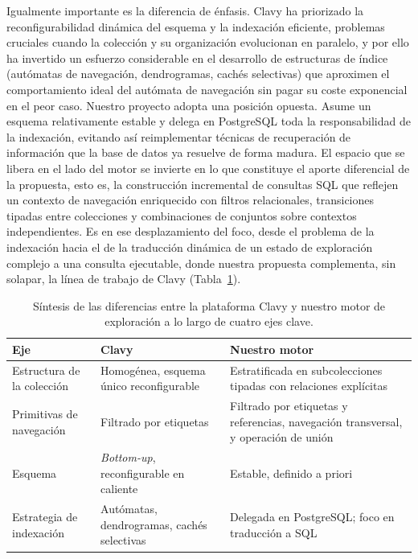 Igualmente importante es la diferencia de énfasis. Clavy ha priorizado la reconfigurabilidad dinámica
del esquema y la indexación eficiente, problemas cruciales cuando la colección y su organización
evolucionan en paralelo, y por ello ha invertido un esfuerzo considerable en el desarrollo de
estructuras de índice (autómatas de navegación, dendrogramas, cachés selectivas) que aproximen el
comportamiento ideal del autómata de navegación sin pagar su coste exponencial en el peor caso.
Nuestro proyecto adopta una posición opuesta. Asume un esquema relativamente estable y delega en
PostgreSQL toda la responsabilidad de la indexación, evitando así reimplementar técnicas de
recuperación de información que la base de datos ya resuelve de forma madura. El espacio que se
libera en el lado del motor se invierte en lo que constituye el aporte diferencial de la propuesta, esto
es, la construcción incremental de consultas SQL que reflejen un contexto de navegación enriquecido
con filtros relacionales, transiciones tipadas entre colecciones y combinaciones de conjuntos sobre
contextos independientes. Es en ese desplazamiento del foco, desde el problema de la indexación hacia
el de la traducción dinámica de un estado de exploración complejo a una consulta ejecutable, donde
nuestra propuesta complementa, sin solapar, la línea de trabajo de Clavy
(Tabla~\ref{tab:clavyComparativa}).

\begin{table}[h]
  \centering
  \begin{tabular}{@{}p{}p{}p{}@{}}
    \toprule
    \textbf{Eje} & \textbf{Clavy} & \textbf{Nuestro motor} \\
    \midrule
    Estructura de la colección
      & Homogénea, esquema único reconfigurable
      & Estratificada en subcolecciones tipadas con relaciones explícitas \\
    Primitivas de navegación
      & Filtrado por etiquetas
      & Filtrado por etiquetas y referencias, navegación transversal, y operación de unión \\
    Esquema
      & \textit{Bottom-up}, reconfigurable en caliente
      & Estable, definido a priori \\
    Estrategia de indexación
      & Autómatas, dendrogramas, cachés selectivas
      & Delegada en PostgreSQL; foco en traducción a SQL \\
    \bottomrule
  \end{tabular}
  \caption[Comparativa Clavy]{Síntesis de las
    diferencias entre la plataforma Clavy y nuestro motor de
    exploración a lo largo de cuatro ejes clave.}
  \label{tab:clavyComparativa}
\end{table}

